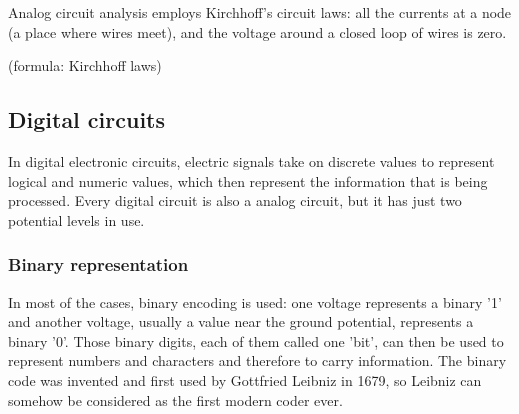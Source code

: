 \documentclass[11pt]{article}
\begin{document}
Analog circuit analysis employs Kirchhoff's circuit laws: all the currents at a node (a place where wires meet), and the voltage around a closed loop of wires is zero. 

(formula: Kirchhoff laws)

\subsection{Digital circuits}
In digital electronic circuits, electric signals take on discrete values to represent logical and numeric values, which then represent the information that is being processed. Every digital circuit is also a analog circuit, but it has just two potential levels in use. 
\subsubsection{Binary representation}
In most of the cases, binary encoding is used: one voltage represents a binary '1' and another voltage, usually a value near the ground potential, represents a binary '0'. Those binary digits, each of them called one 'bit', can then be used to represent numbers and characters and therefore to carry information. The binary code was invented and first used by Gottfried Leibniz in 1679, so Leibniz can somehow be considered as the first modern coder ever. 

\end{document}
